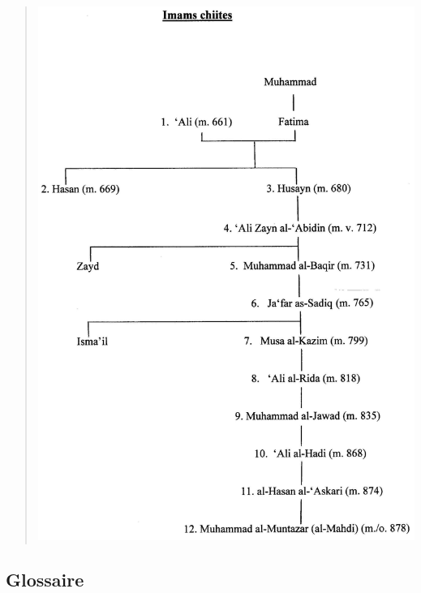 \begin{quote}
\includegraphics[width=\textwidth]{CourantsIslamContemporain/ImagesCourantsIslamContemporain/image2.png}
\end{quote}

\hypertarget{glossaire-5}{%
\subsection{\texorpdfstring{{Glossaire}}{Glossaire}}\label{glossaire-5}}


